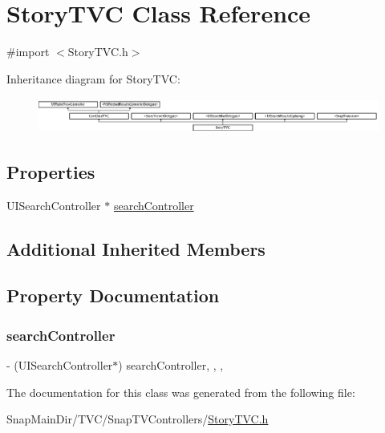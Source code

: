 \hypertarget{interface_story_t_v_c}{}\section{Story\+T\+VC Class Reference}
\label{interface_story_t_v_c}


{\ttfamily \#import $<$Story\+T\+V\+C.\+h$>$}

Inheritance diagram for Story\+T\+VC\+:\begin{figure}[H]
\begin{center}
\leavevmode
\includegraphics[height=1.152263cm]{interface_story_t_v_c}
\end{center}
\end{figure}
\subsection*{Properties}
\begin{DoxyCompactItemize}
\item 
U\+I\+Search\+Controller $\ast$ \hyperlink{interface_story_t_v_c_af0ec10dfe024b518271e05b2f3afcb9b}{search\+Controller}
\end{DoxyCompactItemize}
\subsection*{Additional Inherited Members}


\subsection{Property Documentation}
\hypertarget{interface_story_t_v_c_af0ec10dfe024b518271e05b2f3afcb9b}{}\label{interface_story_t_v_c_af0ec10dfe024b518271e05b2f3afcb9b} 
\subsubsection{\texorpdfstring{search\+Controller}{searchController}}
{\footnotesize\ttfamily -\/ (U\+I\+Search\+Controller$\ast$) search\+Controller\hspace{0.3cm}{\ttfamily [read]}, {\ttfamily [write]}, {\ttfamily [nonatomic]}, {\ttfamily [assign]}}



The documentation for this class was generated from the following file\+:\begin{DoxyCompactItemize}
\item 
Snap\+Main\+Dir/\+T\+V\+C/\+Snap\+T\+V\+Controllers/\hyperlink{_story_t_v_c_8h}{Story\+T\+V\+C.\+h}\end{DoxyCompactItemize}
